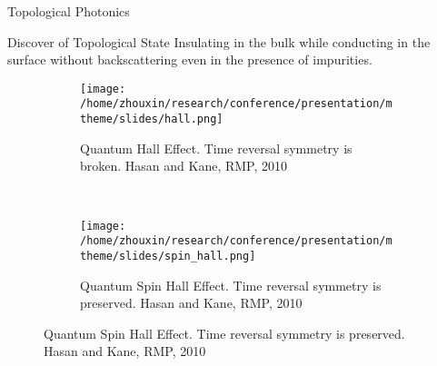 \documentclass{beamer}
\newenvironment{variableblock}[3]{%
  \setbeamercolor{block body}{#2}
  \setbeamercolor{block title}{#3}
  \begin{block}{#1}}{\end{block}}
\begin{document}
\begin{frame}{Topological Photonics}
\begin{block}{Discover of Topological State}
Insulating in the bulk while conducting in the surface without backscattering even in the presence of impurities.
\begin{figure}
    \centering
    \begin{subfigure}[t]{0.4\textwidth}
        \texttt{[image: /home/zhouxin/research/conference/presentation/mtheme/slides/hall.png]}
        \caption{Quantum Hall Effect. Time reversal symmetry is broken. Hasan and Kane, RMP, 2010}
        \label{fig:gull}
    \end{subfigure}\hspace*{3.0em}%
    ~ %
    \begin{subfigure}[t]{0.415\textwidth}
        \texttt{[image: /home/zhouxin/research/conference/presentation/mtheme/slides/spin\_hall.png]}
        \caption{Quantum Spin Hall Effect. Time reversal symmetry is preserved. Hasan and Kane, RMP, 2010}
        \label{fig:tiger}
    \end{subfigure}
\label{fig:animals}
\end{figure}      


\end{block}

\end{frame}
\end{document}
